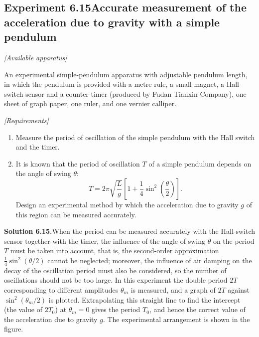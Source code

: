 \subsection*{Experiment 6.15\quad Accurate measurement of the acceleration due to gravity with a simple pendulum}

\noindent\textit{[Available apparatus]}

An experimental simple-pendulum apparatus with adjustable pendulum length, in which the pendulum is provided with a metre rule, a small magnet, a Hall-switch sensor and a counter-timer (produced by Fudan Tianxin Company), one sheet of graph paper, one ruler, and one vernier calliper.

\noindent\textit{[Requirements]}
\begin{enumerate}[label=(\arabic*),leftmargin=2.2em,itemsep=1pt,topsep=2pt]
\item Measure the period of oscillation of the simple pendulum with the Hall switch and the timer.
\item It is known that the period of oscillation $T$ of a simple pendulum depends on the angle of swing $\theta$:
\begin{equation*}
T=2\pi\sqrt{\frac{L}{g}}\left[1+\frac{1}{4}\sin^{2}\left(\frac{\theta}{2}\right)\right].
\end{equation*}
Design an experimental method by which the acceleration due to gravity $g$ of this region can be measured accurately.
\end{enumerate}

\medskip
\noindent\textbf{Solution 6.15.}\quad When the period can be measured accurately with the Hall-switch sensor together with the timer, the influence of the angle of swing $\theta$ on the period $T$ must be taken into account, that is, the second-order approximation $\frac{1}{4}\sin^{2}(\theta/2)$ cannot be neglected; moreover, the influence of air damping on the decay of the oscillation period must also be considered, so the number of oscillations should not be too large. In this experiment the double period $2T$ corresponding to different amplitudes $\theta_m$ is measured, and a graph of $2T$ against $\sin^{2}(\theta_m/2)$ is plotted. Extrapolating this straight line to find the intercept (the value of $2T_0$) at $\theta_m=0$ gives the period $T_0$, and hence the correct value of the acceleration due to gravity $g$. The experimental arrangement is shown in the figure.

